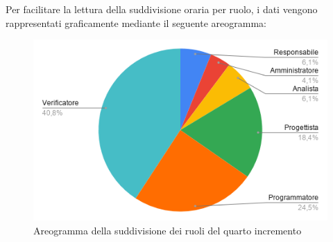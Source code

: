 \documentclass[../piano-di-progetto.tex]{subfiles}
\begin{document}
  Per facilitare la lettura della suddivisione oraria per ruolo, i dati vengono rappresentati graficamente mediante il seguente areogramma:
  \begin{figure}[H]
    \centering
    \includegraphics[width=12cm]{img/ruoli-4-incr.png}
    \caption{Areogramma della suddivisione dei ruoli del quarto incremento}
    \label{fig:ore-ruolo-progettazione}
  \end{figure}
\end{document}
